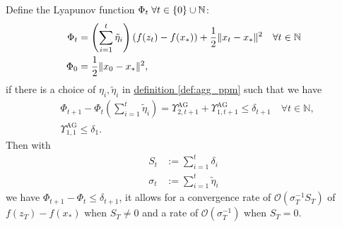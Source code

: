     \begin{theorem}
    \label{thm:generic_ag_convergence}
        Define the Lyapunov function $\Phi_t\; \forall t \in \{0\}\cup \mathbb N$: 
        \begin{align*}
            \Phi_t &= \left(
                \sum_{i = 1}^{t} \tilde\eta_{i}
            \right) (f(z_t) - f(x_*)) + \frac{1}{2}\Vert x_t - x_*\Vert^2 \quad \forall t \in \mathbb N
            \\
            \Phi_0 &= \frac{1}{2}\Vert x_0 - x_*\Vert^2, 
        \end{align*}
        if there is a choice of $\eta_i, \tilde \eta_i$ in \hyperref[def:agg_ppm]{definition \ref*{def:agg_ppm}} such that we have 
        \begin{align*}
            & \Phi_{t + 1} - \Phi_{t}\left(
                \sum_{i = 1}^{t} \tilde \eta_i
            \right) =
            \Upsilon_{2, t + 1}^{\text{AG}} + 
            \Upsilon_{1, t + 1}^{\text{AG}} 
            \le \delta_{t + 1} \quad 
            \forall t \in \mathbb N, 
            \\
            & \Upsilon_{1, 1}^{\text{AG}} \le \delta_1. 
        \end{align*}
        Then with
        \begin{align*}
            S_t &:= \sum_{i = 1}^{t} \delta_i
            \\
            \sigma_t &:= \sum_{i = 1}^{t}\tilde \eta_i
        \end{align*}
        we have $\Phi_{t + 1} - \Phi_t \le \delta_{t + 1}$, it allows for a convergence rate of $\mathcal O \left(\sigma_T^{-1}S_T\right)$ of $f(z_T) - f(x_*)$ when $S_T \neq 0$ and a rate of $\mathcal O(\sigma_T^{-1})$ when $S_T = 0$. 
    \end{theorem}
